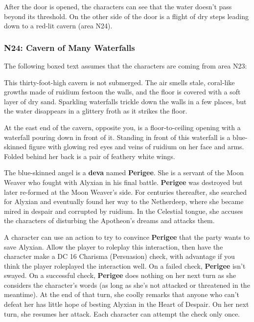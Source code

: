 \documentclass[10pt,a4paper,twoside,fancy,bg=print,twocolumn,openany,nodeprecatedcode]{dndbook}
\begin{document}
After the door is opened, the characters can see that the water doesn't pass beyond its threshold. On the other side of the door is a flight of dry steps leading down to a red-lit cavern (area N24).

\subsubsection{N24: Cavern of Many Waterfalls}
The following boxed text assumes that the characters are coming from area N23:

\begin{DndReadAloud}{}
This thirty-foot-high cavern is not submerged. The air smells stale, coral-like growths made of ruidium festoon the walls, and the floor is covered with a soft layer of dry sand. Sparkling waterfalls trickle down the walls in a few places, but the water disappears in a glittery froth as it strikes the floor.

At the east end of the cavern, opposite you, is a floor-to-ceiling opening with a waterfall pouring down in front of it. Standing in front of this waterfall is a blue-skinned figure with glowing red eyes and veins of ruidium on her face and arms. Folded behind her back is a pair of feathery white wings.

\end{DndReadAloud}

The blue-skinned angel is a \textbf{deva} named \textbf{Perigee}. She is a servant of the Moon Weaver who fought with Alyxian in his final battle. \textbf{Perigee} was destroyed but later re-formed at the Moon Weaver's side. For centuries thereafter, she searched for Alyxian and eventually found her way to the Netherdeep, where she became mired in despair and corrupted by ruidium. In the Celestial tongue, she accuses the characters of disturbing the Apotheon's dreams and attacks them.

A character can use an action to try to convince \textbf{Perigee} that the party wants to save Alyxian. Allow the player to roleplay this interaction, then have the character make a DC 16 Charisma (Persuasion) check, with advantage if you think the player roleplayed the interaction well. On a failed check, \textbf{Perigee} isn't swayed. On a successful check, \textbf{Perigee} does nothing on her next turn as she considers the character's words (as long as she's not attacked or threatened in the meantime). At the end of that turn, she coolly remarks that anyone who can't defeat her has little hope of besting Alyxian in the Heart of Despair. On her next turn, she resumes her attack. Each character can attempt the check only once.
\end{document}
